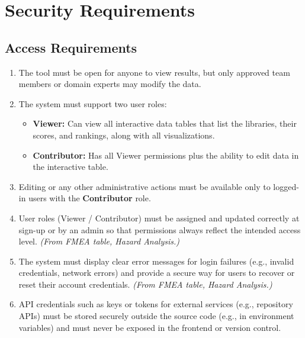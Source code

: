 \documentclass[12pt]{article}
\begin{document}
\section{Security Requirements}
\subsection{Access Requirements}


\begin{enumerate}[label=SR-AC\arabic*]

  \item The tool must be open for anyone to view results, but only approved team members or domain experts may modify the data.

  \item The system must support two user roles:
    \begin{itemize}
        \item \textbf{Viewer:} Can view all interactive data tables that list the libraries, their scores, and rankings, along with all visualizations.
        \item \textbf{Contributor:} Has all Viewer permissions plus the ability to edit data in the interactive table.
    \end{itemize}

  \item Editing or any other administrative actions must be available only to logged-in users with the \textbf{Contributor} role.

  \item User roles (Viewer / Contributor) must be assigned and updated correctly at sign-up or by an admin so that permissions always reflect the intended access level. \textit{(From FMEA table, Hazard Analysis.)}

  \item The system must display clear error messages for login failures (e.g., invalid credentials, network errors) and provide a secure way for users to recover or reset their account credentials. \textit{(From FMEA table, Hazard Analysis.)}

  \item API credentials such as keys or tokens for external services (e.g., repository APIs) must be stored securely outside the source code (e.g., in environment variables) and must never be exposed in the frontend or version control.

\end{enumerate}
\end{document}
